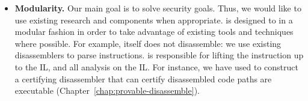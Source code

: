 \begin{itemize}
\item {\bf Modularity.}  Our main goal is to solve security
  goals. Thus, we would like to use existing research and components
  when appropriate.  \bap is designed to in a modular fashion in
  order to take advantage of existing tools and techniques where
  possible. For example, \bap itself does not disassemble: we use
  existing disassemblers to parse instructions. \bap is responsible
  for lifting the instruction up to the IL, and all analysis on the
  IL.  For instance, we have used \bap to construct a certifying
  disassembler that can certify disassembled code paths are executable
  (Chapter~\ref{chap:provable-disassemble}).

\end{itemize}





